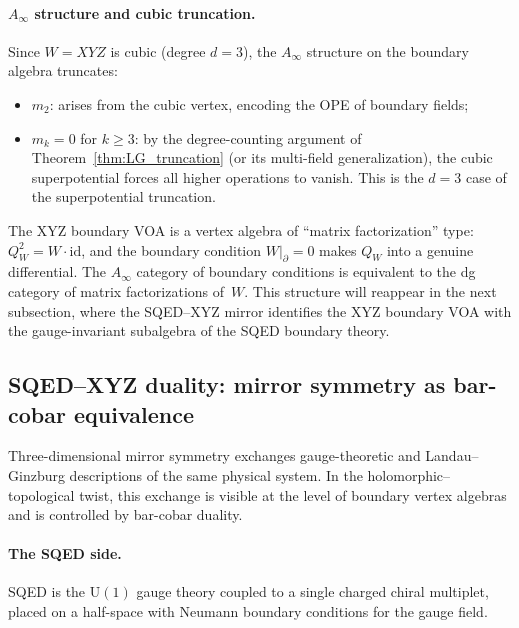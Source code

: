 \paragraph{$A_\infty$ structure and cubic truncation.}
Since $W = XYZ$ is cubic (degree $d = 3$), the $A_\infty$ structure
on the boundary algebra truncates:
\begin{itemize}
\item $m_2$: arises from the cubic vertex, encoding the OPE of boundary
 fields;
\item $m_k = 0$ for $k \geq 3$: by the degree-counting argument of
 Theorem~\ref{thm:LG_truncation} (or its multi-field generalization),
 the cubic superpotential forces all higher operations to vanish.
 This is the $d = 3$ case of the superpotential truncation.
\end{itemize}

\begin{remark}
\label{rem:xyz-matrix-factorization}
The XYZ boundary VOA is a vertex algebra of ``matrix factorization''
type: $Q_W^2 = W \cdot \mathrm{id}$, and the boundary condition
$W|_\partial = 0$ makes $Q_W$ into a genuine differential. The
$A_\infty$ category of boundary conditions is equivalent to the dg
category of matrix factorizations of~$W$. This structure will reappear
in the next subsection, where the SQED--XYZ mirror identifies the XYZ
boundary VOA with the gauge-invariant subalgebra of the SQED boundary
theory.
\end{remark}

\subsection{SQED--XYZ duality: mirror symmetry as bar-cobar equivalence}
\label{subsec:sqed-xyz-mirror}

Three-dimensional mirror symmetry exchanges gauge-theoretic and
Landau--Ginzburg descriptions of the same physical system. In the
holomorphic--topological twist, this exchange is visible at the level
of boundary vertex algebras and is controlled by bar-cobar duality.

\paragraph{The SQED side.}
SQED is the $\mathrm{U}(1)$ gauge theory coupled to a single charged
chiral multiplet, placed on a half-space with Neumann boundary
conditions for the gauge field.

